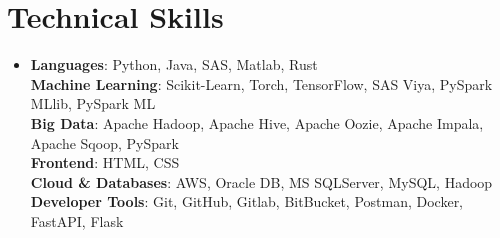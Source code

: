 \section{Technical Skills}
\begin{itemize}[leftmargin=0.15in, label={}]
	\item{
		\textbf{Languages}{: Python, Java, SAS, Matlab, Rust} \\
		\textbf{Machine Learning}{: Scikit-Learn, Torch, TensorFlow, SAS Viya, PySpark MLlib, PySpark ML} \\
		\textbf{Big Data}{: Apache Hadoop, Apache Hive, Apache Oozie, Apache Impala, Apache Sqoop, PySpark} \\
		\textbf{Frontend}{: HTML, CSS} \\
		\textbf{Cloud \& Databases}{: AWS, Oracle DB, MS SQLServer, MySQL, Hadoop} \\
		\textbf{Developer Tools}{: Git, GitHub, Gitlab, BitBucket, Postman, Docker, FastAPI, Flask} \\
		
	}
\end{itemize}
\vspace{-15pt}